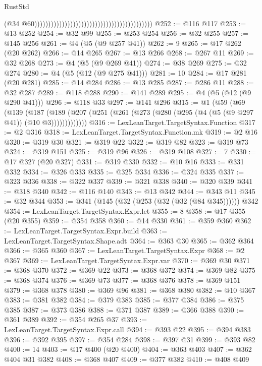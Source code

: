 \begin{lexlean}{RustStd}
\begin{coremodule}
                                                                                        (@34
                                                                                          @60)))))))))))))))))))))))))))))))))))))))))))
@252 := @116 @117
@253 := @13 @252
@254 := @32 @99
@255 := @253 @254
@256 := @32 @255
@257 := @145 @256
@261 := @4 (@5 (@9 @257 @41))
@262 := 9
@265 := @17 @262 (@20 @262)
@266 := @14 @265
@267 := @13 @266
@268 := @267 @11
@269 := @32 @268
@273 := @4 (@5 (@9 @269 @41))
@274 := @38 @269
@275 := @32 @274
@280 := @4 (@5 (@12 (@9 @275 @41)))
@281 := 10
@284 := @17 @281 (@20 @281)
@285 := @14 @284
@286 := @13 @285
@287 := @286 @11
@288 := @32 @287
@289 := @118 @288
@290 := @141 @289
@295 := @4 (@5 (@12 (@9 @290 @41)))
@296 := @118 @33
@297 := @141 @296
@315 := @1
    (@59
      (@69
        (@139
          (@187
            (@189 (@207 (@251 (@261 (@273 (@280 (@295 (@4 (@5 (@9 @297 @41)) (@10 @3)))))))))))))
@316 := LexLeanTarget.TargetSyntax.Function
@317 := @2 @316
@318 := LexLeanTarget.TargetSyntax.Function.mk
@319 := @2 @16
@320 := @319 @30
@321 := @319 @22
@322 := @319 @82
@323 := @319 @73
@324 := @319 @151
@325 := @319 @96
@326 := @319 @108
@327 := 7
@330 := @17 @327 (@20 @327)
@331 := @319 @330
@332 := @10 @16
@333 := @331 @332
@334 := @326 @333
@335 := @325 @334
@336 := @324 @335
@337 := @323 @336
@338 := @322 @337
@339 := @321 @338
@340 := @320 @339
@341 := @318 @340
@342 := @116 @140
@343 := @13 @342
@344 := @343 @11
@345 := @32 @344
@353 := @341 (@145 (@32 (@253 (@32 (@32 (@84 @345)))))) @342
@354 := LexLeanTarget.TargetSyntax.Expr.let
@355 := 8
@358 := @17 @355 (@20 @355)
@359 := @354 @358
@360 := @14 @330
@361 := @359 @360
@362 := LexLeanTarget.TargetSyntax.Expr.build
@363 := LexLeanTarget.TargetSyntax.Shape.adt
@364 := @363 @30
@365 := @362 @364
@366 := @365 @360
@367 := LexLeanTarget.TargetSyntax.Expr
@368 := @2 @367
@369 := LexLeanTarget.TargetSyntax.Expr.var
@370 := @369 @30
@371 := @368 @370
@372 := @369 @22
@373 := @368 @372
@374 := @369 @82
@375 := @368 @374
@376 := @369 @73
@377 := @368 @376
@378 := @369 @151
@379 := @368 @378
@380 := @369 @96
@381 := @368 @380
@382 := @10 @367
@383 := @381 @382
@384 := @379 @383
@385 := @377 @384
@386 := @375 @385
@387 := @373 @386
@388 := @371 @387
@389 := @366 @388
@390 := @361 @389
@392 := @354 @265 @37
@393 := LexLeanTarget.TargetSyntax.Expr.call
@394 := @393 @22
@395 := @394 @383
@396 := @392 @395
@397 := @354 @284
@398 := @397 @31
@399 := @393 @82
@400 := 14
@403 := @17 @400 (@20 @400)
@404 := @363 @403
@407 := @362 @404 @31 @382
@408 := @368 @407
@409 := @377 @382
@410 := @408 @409

\end{coremodule}
\end{lexlean}
